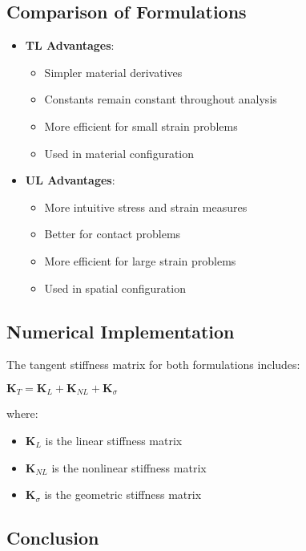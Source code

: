 \documentclass{article}
\begin{document}
\subsection{Comparison of Formulations}

\begin{itemize}
    \item \textbf{TL Advantages}:
        \begin{itemize}
            \item Simpler material derivatives
            \item Constants remain constant throughout analysis
            \item More efficient for small strain problems
            \item Used in material configuration
        \end{itemize}
    
    \item \textbf{UL Advantages}:
        \begin{itemize}
            \item More intuitive stress and strain measures
            \item Better for contact problems
            \item More efficient for large strain problems
            \item Used in spatial configuration
        \end{itemize}
\end{itemize}

\subsection{Numerical Implementation}

The tangent stiffness matrix for both formulations includes:

$ \mathbf{K}_T = \mathbf{K}_L + \mathbf{K}_{NL} + \mathbf{K}_{\sigma} $

where:
\begin{itemize}
    \item $\mathbf{K}_L$ is the linear stiffness matrix
    \item $\mathbf{K}_{NL}$ is the nonlinear stiffness matrix
    \item $\mathbf{K}_{\sigma}$ is the geometric stiffness matrix
\end{itemize}

\subsection{Conclusion}
\end{document}

